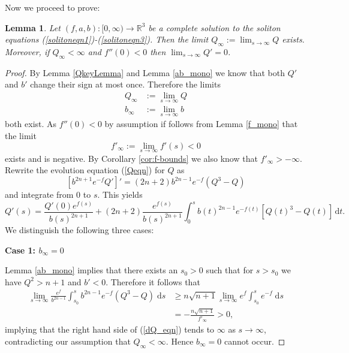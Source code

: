 \documentclass{amsart}
\newtheorem{lem}[thm]{Lemma}
\theoremstyle{definition}
\theoremstyle{remark}
\numberwithin{equation}{section}
\newcommand{\R}{\mathbb{R}}  %
\begin{document}
Now we proceed to prove:
\begin{lem}
\label{criticalLemma}
Let $(f,a,b): [0,\infty) \rightarrow \R^3$ be a complete solution to the soliton equations (\ref{solitoneqn1})-(\ref{solitoneqn3}). 
Then the limit $Q_{\infty} :=\lim_{s\rightarrow \infty} Q$ exists. Moreover, if $Q_{\infty} < \infty$ and $f''(0) < 0$ then $\lim_{s\rightarrow\infty} Q' = 0$.
\end{lem}
\begin{proof}
By Lemma \ref{QkeyLemma} and Lemma \ref{ab_mono} we know that both $Q'$ and $b'$ change their sign at most once. Therefore the limits 
\begin{align*}
Q_{\infty}&:=\lim_{s\rightarrow \infty} Q   \\
b_{\infty}&:= \lim_{s\rightarrow \infty} b
\end{align*}
both exist. As $f''(0)<0$ by assumption if follows from Lemma \ref{f_mono} that the limit
\begin{equation*}
f'_{\infty} := \lim_{s\rightarrow\infty} f'(s)  < 0 
\end{equation*}
exists and is negative. By Corollary \ref{cor:f-bounds} we also know that $f'_\infty > -\infty$. Rewrite the evolution equation (\ref{Qeqn}) for $Q$ as
\begin{equation*}
\left[b^{2n+1}e^{-f}Q'\right]' = (2n+2)b^{2n-1}e^{-f}\left(Q^3-Q\right)
\end{equation*}
and integrate from $0$ to $s$. This yields 
\begin{equation}
\label{dQ_eqn}
Q'(s) = \frac{Q'(0)e^{f(s)}}{b(s)^{2n+1}} + (2n+2)\frac{e^{f(s)}}{b(s)^{2n+1}}\int_{0}^s b(t)^{2n-1}e^{-f(t)}\left[Q(t)^3-Q(t)\right]\,\mathrm{d}t.
\end{equation}
We distinguish the following three cases:

\vspace{0.5em}
\noindent\textbf{Case 1: $b_{\infty} = 0$}
\vspace{0.5em}

\noindent Lemma \ref{ab_mono} implies that there exists an $s_0 >0$ such that for $s>s_0$ we have $Q^2 > n + 1$ and $b' < 0$. Therefore it follows that
\begin{align*}
\lim_{s \rightarrow \infty} \frac{e^{f}}{b^{2n-1}}\int_{s_0}^{s} b^{2n-1}e^{-f}\left(Q^3-Q\right) \; \mathrm{d}s &\geq n\sqrt{n+1} \lim_{s \rightarrow \infty} e^{f} \int_{s_0}^s e^{-f}\; \mathrm{d}s \\
&= - \frac{n\sqrt{n+1}}{f'_{\infty}} > 0,
\end{align*}
implying that the right hand side of (\ref{dQ_eqn}) tends to $\infty$ as $s \rightarrow \infty$, contradicting our assumption that $Q_{\infty} < \infty$. Hence $b_\infty = 0$ cannot occur. 


\end{proof}
\end{document}
